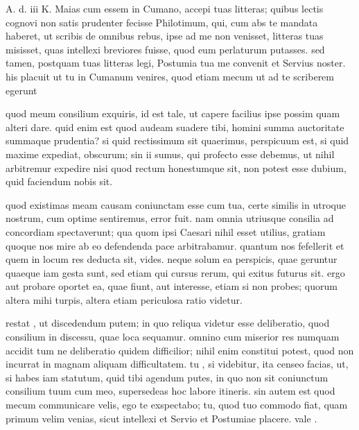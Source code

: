 


 A. d. iii K. Maias cum essem in Cumano, accepi tuas litteras; quibus lectis cognovi non satis prudenter fecisse Philotimum, qui, cum abs te mandata haberet, ut scribis de omnibus rebus, ipse ad me non venisset, litteras tuas misisset, quas intellexi breviores fuisse, quod eum perlaturum putasses. sed tamen, postquam tuas litteras legi, Postumia tua me convenit et Servius noster. his placuit ut tu in Cumanum venires, quod etiam mecum ut ad te scriberem egerunt

 quod meum consilium exquiris, id est tale, ut capere facilius ipse possim quam alteri dare. quid enim est quod audeam suadere tibi, homini summa auctoritate summaque prudentia? si quid rectissimum sit quaerimus, perspicuum est, si quid maxime expediat, obscurum; sin ii sumus, qui profecto esse debemus, ut nihil arbitremur expedire nisi quod rectum honestumque sit, non potest esse dubium, quid faciendum nobis sit.

 quod existimas meam causam coniunctam esse cum tua, certe similis in utroque nostrum, cum optime sentiremus, error fuit. nam omnia utriusque consilia ad concordiam spectaverunt; qua quom ipsi Caesari nihil esset utilius, gratiam quoque nos mire ab eo defendenda pace arbitrabamur. quantum nos fefellerit et quem in locum res deducta sit, vides. neque solum ea perspicis, quae geruntur quaeque iam gesta sunt, sed etiam qui cursus rerum, qui exitus futurus sit. ergo aut probare oportet ea, quae fiunt, aut interesse, etiam si non probes; quorum altera mihi turpis, altera etiam periculosa ratio videtur.

 restat , ut discedendum putem; in quo reliqua videtur esse deliberatio, quod consilium in discessu, quae loca sequamur. omnino cum miserior res numquam accidit tum ne deliberatio quidem difficilior; nihil enim constitui potest, quod non incurrat in magnam aliquam difficultatem. tu , si videbitur, ita censeo facias, ut, si habes iam statutum, quid tibi agendum putes, in quo non sit coniunctum consilium tuum cum meo, supersedeas hoc labore itineris. sin autem est quod mecum communicare velis, ego te exspectabo; tu, quod tuo commodo fiat, quam primum velim venias, sicut intellexi et Servio et Postumiae placere. vale .
